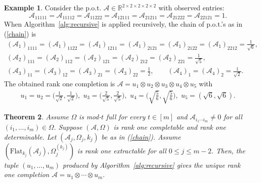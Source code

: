 \documentclass{amsart}
\newcommand{\re}{\mathbb{R}}
\newcommand{\reff}[1]{(\ref{#1})}
\newcommand{\mc}[1]{\mathcal{#1}}
\newcommand{\ddd}{,\ldots,}
\newcommand{\Flat}{\mbox{Flat}}
\newcommand{\baray}{\begin{array}}
\newcommand{\earay}{\end{array}}
\newtheorem{theorem}{Theorem}[section]
\theoremstyle{definition}
\newtheorem{example}[theorem]{Example}
\numberwithin{equation}{section}
\begin{document}
\begin{example}
Consider the p.o.t. $\mc{A} \in \re^{2 \times 2 \times 2 \times 2 \times 2}$ with observed entries:
\[
\mc{A}_{11111} = \mc{A}_{11112} = \mc{A}_{11222  } = \mc{A}_{12111} 
= \mc{A}_{21211} = \mc{A}_{21222} =  \mc{A}_{22121} = 1.
\]
When Algorithm~\ref{alg:recursive} is applied recursively,
the chain of p.o.t.'s as in \reff{chain} is
\[
\baray{l}
(\mc{A}_1)_{1     1     1     1} 
= (\mc{A}_1)_{1     1     2     2}
= (\mc{A}_1)_{1     2     1     1}
= (\mc{A}_1)_{2     1     2     1}
= (\mc{A}_1)_{2     1     2     2}
= (\mc{A}_1)_{2     2     1     2} = \frac{1}{\sqrt{6}}, \\
(\mc{A}_2)_{1     1     1}
= (\mc{A}_2)_{1     1     2}
= (\mc{A}_2)_{1     2     1}
= (\mc{A}_2)_{2     1     2}
= (\mc{A}_2)_{2     2     1} = \frac{1}{\sqrt{5}}, \\
(\mc{A}_3)_{1     1}
=(\mc{A}_3)_{1     2}
= (\mc{A}_3)_{2     1}
= (\mc{A}_3)_{2     2} = \frac{1}{2},
\qquad
(\mc{A}_4)_1 = (\mc{A}_4)_2 = \frac{1}{\sqrt{2}}.
\earay
\]
The obtained rank one completion is
$\mc{A} = u_1 \otimes u_2 \otimes u_3 \otimes u_4 \otimes u_5$ with
\[
\baray{c}
u_1 = u_2 = \big( \frac{1}{\sqrt{2}},
\frac{1}{\sqrt{2}} \big),
\,\, u_3 = \big( \frac{2}{\sqrt{5}},
\frac{2}{\sqrt{5}} \big),
\,\, u_4 = \big( \sqrt{\frac{5}{6}}, \sqrt{\frac{5}{6}} \big),
\,\, u_5 = (\sqrt{6}, \sqrt{6}).
\earay
\]
\end{example}











\begin{theorem}\label{thm:alg_unique}
Assume $\Omega$ is mod-$t$ full for every $t \in [m]$ and
$\mc{A}_{i_1 \cdots i_m} \ne 0$ for all $(i_1 \ddd i_m) \in \Omega$.
Suppose $(\mc{A}, \Omega)$ is rank one completable and rank one determinable.
Let $(\mc{A}_j,\Omega_j, k_j)$ be as in \reff{chain}.
Assume $(\Flat_{k_j}(\mc{A}_j), \Omega_j^{(k_j)})$ is rank one extractable for all $0 \le j \le m-2$.
Then, the tuple $(u_1 \ddd u_m)$ produced by Algorithm~\ref{alg:recursive} 
gives the unique rank one completion
$
\mc{A} = u_1 \otimes \cdots \otimes u_m.
$
\end{theorem}
\end{document}
